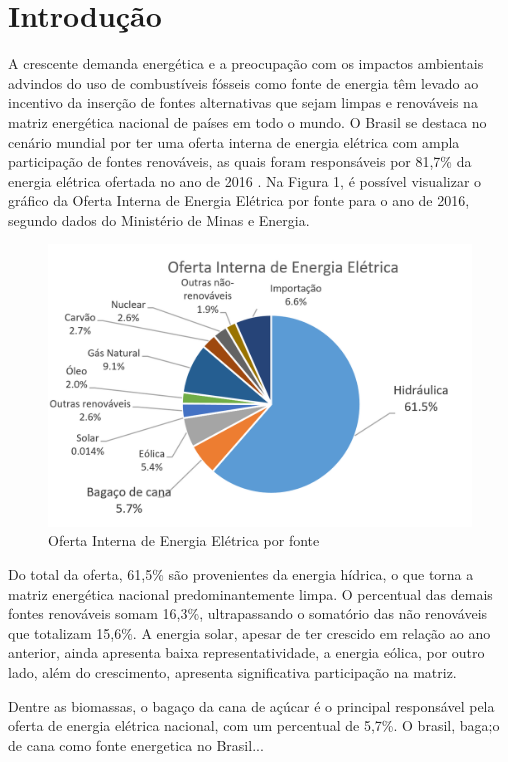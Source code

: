 \chapter[Introdução]{Introdução}

A crescente demanda energética e a preocupação com os impactos ambientais advindos do uso de combustíveis fósseis como fonte de energia têm levado ao incentivo da inserção de fontes alternativas que sejam limpas e renováveis na matriz energética nacional de países em todo o mundo. O Brasil se destaca no cenário mundial por ter uma oferta interna de energia elétrica com ampla participação de fontes renováveis, as quais foram responsáveis por 81,7\% da energia elétrica ofertada no ano de 2016 \cite{mme2017}. Na Figura 1, é possível visualizar o gráfico da Oferta Interna de Energia Elétrica por fonte para o ano de 2016, segundo dados do Ministério de Minas e Energia.

\begin{figure}[!htb]
	\centering
	\includegraphics{OIEE}
	\caption{Oferta Interna de Energia Elétrica por fonte \cite{mme2017}}
\end{figure}

Do total da oferta, 61,5\% são provenientes da energia hídrica, o que torna a matriz energética nacional predominantemente limpa. O percentual das demais fontes renováveis somam 16,3\%, ultrapassando o somatório das não renováveis que totalizam 15,6\%. A energia solar, apesar de ter crescido em relação ao ano anterior, ainda apresenta baixa representatividade, a energia eólica, por outro lado, além do crescimento, apresenta significativa participação na matriz.

Dentre as biomassas, o bagaço da cana de açúcar é o principal responsável pela oferta de energia elétrica nacional, com um percentual de 5,7\%. O brasil, baga;o de cana como fonte energetica no Brasil...

